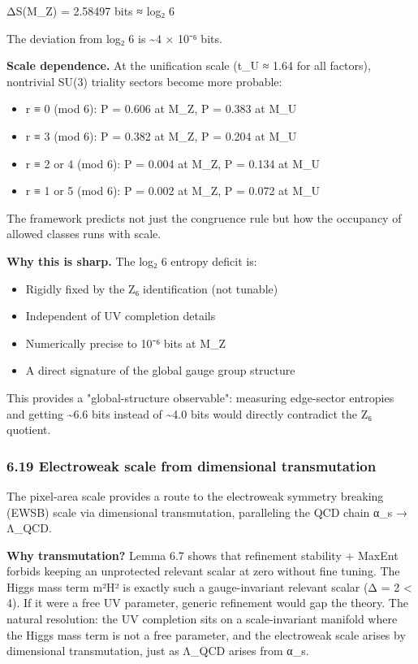ΔS(M\_Z) = 2.58497 bits ≈ log₂ 6

The deviation from log₂ 6 is \textasciitilde4 × 10⁻⁶ bits.

\textbf{Scale dependence.} At the unification scale (t\_U ≈ 1.64 for all factors), nontrivial SU(3) triality sectors become more probable:

\begin{itemize}
\tightlist
\item
  r ≡ 0 (mod 6): P = 0.606 at M\_Z, P = 0.383 at M\_U
\item
  r ≡ 3 (mod 6): P = 0.382 at M\_Z, P = 0.204 at M\_U
\item
  r ≡ 2 or 4 (mod 6): P = 0.004 at M\_Z, P = 0.134 at M\_U
\item
  r ≡ 1 or 5 (mod 6): P = 0.002 at M\_Z, P = 0.072 at M\_U
\end{itemize}

The framework predicts not just the congruence rule but how the occupancy of allowed classes runs with scale.

\textbf{Why this is sharp.} The log₂ 6 entropy deficit is:

\begin{itemize}
\tightlist
\item
  Rigidly fixed by the Z₆ identification (not tunable)
\item
  Independent of UV completion details
\item
  Numerically precise to 10⁻⁶ bits at M\_Z
\item
  A direct signature of the global gauge group structure
\end{itemize}

This provides a "global-structure observable": measuring edge-sector entropies and getting \textasciitilde6.6 bits instead of \textasciitilde4.0 bits would directly contradict the Z₆ quotient.

\subsubsection{6.19 Electroweak scale from dimensional transmutation}\label{619-electroweak-scale-from-dimensional-transmutation}

The pixel-area scale provides a route to the electroweak symmetry breaking (EWSB) scale via dimensional transmutation, paralleling the QCD chain α\_s → Λ\_QCD.

\textbf{Why transmutation?} Lemma 6.7 shows that refinement stability + MaxEnt forbids keeping an unprotected relevant scalar at zero without fine tuning. The Higgs mass term m²\textbar H\textbar² is exactly such a gauge-invariant relevant scalar (Δ = 2 \textless{} 4). If it were a free UV parameter, generic refinement would gap the theory. The natural resolution: the UV completion sits on a scale-invariant manifold where the Higgs mass term is not a free parameter, and the electroweak scale arises by dimensional transmutation, just as Λ\_QCD arises from α\_s.

